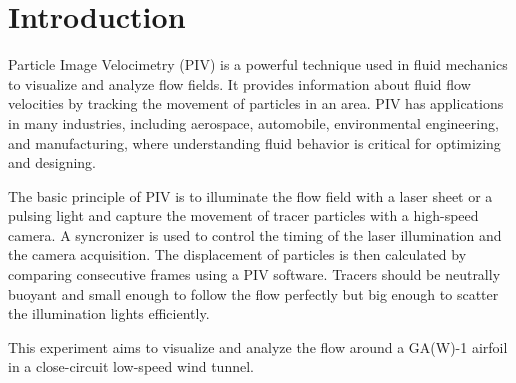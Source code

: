 \chapter{Introduction}
\label{cp:introduction}
Particle Image Velocimetry (PIV) is a powerful technique used in fluid mechanics to visualize and analyze flow fields. It provides information about fluid flow velocities by tracking the movement of particles in an area. PIV has applications in many industries, including aerospace, automobile, environmental engineering, and manufacturing, where understanding fluid behavior is critical for optimizing and designing.

The basic principle of PIV is to illuminate the flow field with a laser sheet or a pulsing light and capture the movement of tracer particles with a high-speed camera. A syncronizer is used to control the timing of the laser illumination and the camera acquisition. The displacement of particles is then calculated by comparing consecutive frames using a PIV software. Tracers should be neutrally buoyant and small enough to follow the flow perfectly but big enough to scatter the illumination lights efficiently.

This experiment aims to visualize and analyze the flow around a GA(W)-1 airfoil in a close-circuit low-speed wind tunnel. 
